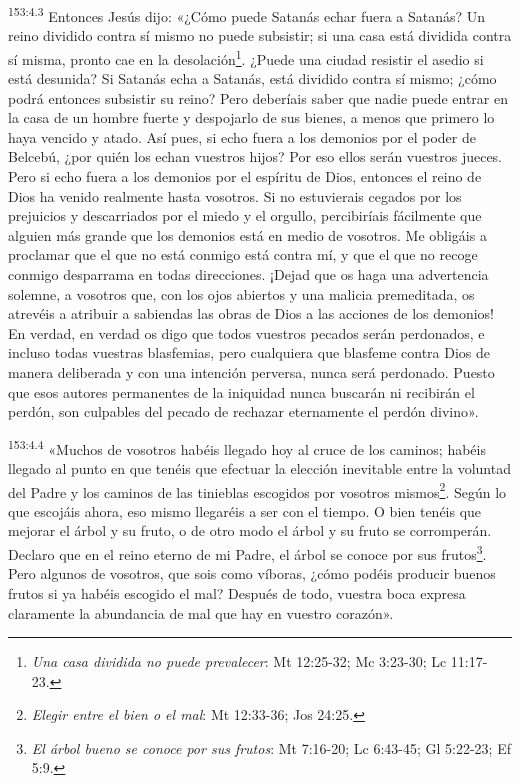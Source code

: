 \par
\textsuperscript{153:4.3} Entonces Jesús dijo: «¿Cómo puede Satanás echar fuera a Satanás? Un reino dividido contra sí mismo no puede subsistir; si una casa está dividida contra sí misma, pronto cae en la desolación\footnote{\textit{Una casa dividida no puede prevalecer}: Mt 12:25-32; Mc 3:23-30; Lc 11:17-23.}. ¿Puede una ciudad resistir el asedio si está desunida? Si Satanás echa a Satanás, está dividido contra sí mismo; ¿cómo podrá entonces subsistir su reino? Pero deberíais saber que nadie puede entrar en la casa de un hombre fuerte y despojarlo de sus bienes, a menos que primero lo haya vencido y atado. Así pues, si echo fuera a los demonios por el poder de Belcebú, ¿por quién los echan vuestros hijos? Por eso ellos serán vuestros jueces. Pero si echo fuera a los demonios por el espíritu de Dios, entonces el reino de Dios ha venido realmente hasta vosotros. Si no estuvierais cegados por los prejuicios y descarriados por el miedo y el orgullo, percibiríais fácilmente que alguien más grande que los demonios está en medio de vosotros. Me obligáis a proclamar que el que no está conmigo está contra mí, y que el que no recoge conmigo desparrama en todas direcciones. ¡Dejad que os haga una advertencia solemne, a vosotros que, con los ojos abiertos y una malicia premeditada, os atrevéis a atribuir a sabiendas las obras de Dios a las acciones de los demonios! En verdad, en verdad os digo que todos vuestros pecados serán perdonados, e incluso todas vuestras blasfemias, pero cualquiera que blasfeme contra Dios de manera deliberada y con una intención perversa, nunca será perdonado. Puesto que esos autores permanentes de la iniquidad nunca buscarán ni recibirán el perdón, son culpables del pecado de rechazar eternamente el perdón divino».

\par
\textsuperscript{153:4.4} «Muchos de vosotros habéis llegado hoy al cruce de los caminos; habéis llegado al punto en que tenéis que efectuar la elección inevitable entre la voluntad del Padre y los caminos de las tinieblas escogidos por vosotros mismos\footnote{\textit{Elegir entre el bien o el mal}: Mt 12:33-36; Jos 24:25.}. Según lo que escojáis ahora, eso mismo llegaréis a ser con el tiempo. O bien tenéis que mejorar el árbol y su fruto, o de otro modo el árbol y su fruto se corromperán. Declaro que en el reino eterno de mi Padre, el árbol se conoce por sus frutos\footnote{\textit{El árbol bueno se conoce por sus frutos}: Mt 7:16-20; Lc 6:43-45; Gl 5:22-23; Ef 5:9.}. Pero algunos de vosotros, que sois como víboras, ¿cómo podéis producir buenos frutos si ya habéis escogido el mal? Después de todo, vuestra boca expresa claramente la abundancia de mal que hay en vuestro corazón».

